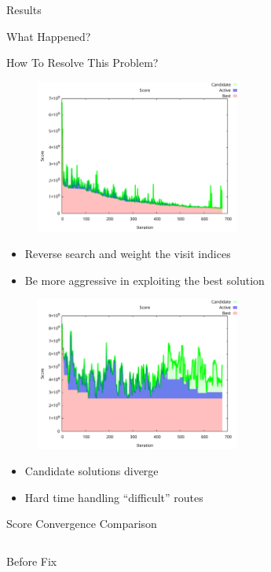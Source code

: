 \documentclass[aspectratio=169]{beamer}
\begin{document}
\begin{frame}[label={sec:org4ee59dd}]{Results}
\begin{frame}[label={sec:orgc40313a}]{What Happened?}
\end{frame}
\begin{frame}[label={sec:orgf804da2}]{How To Resolve This Problem?}
\begin{figure}[htpb]
\centering
    \includegraphics[width=0.6\textwidth]{img/score-convergence}
\end{figure}

\begin{itemize}
\item Reverse search and weight the visit indices
\item Be more aggressive in exploiting the best solution
\end{itemize}

\begin{figure}[htpb]
\centering
    \includegraphics[width=0.6\textwidth]{img/score-diverge}
\end{figure}

\begin{itemize}
\item Candidate solutions diverge
\item Hard time handling ``difficult'' routes
\end{itemize}
\end{frame}

\begin{frame}[label={sec:orgcfb7869}]{Score Convergence Comparison}
\begin{columns}
\begin{column}{0.5\columnwidth}
\begin{center}
Before Fix
\end{center}


\end{column}
\end{columns}
\end{frame}
\end{frame}
\end{document}
